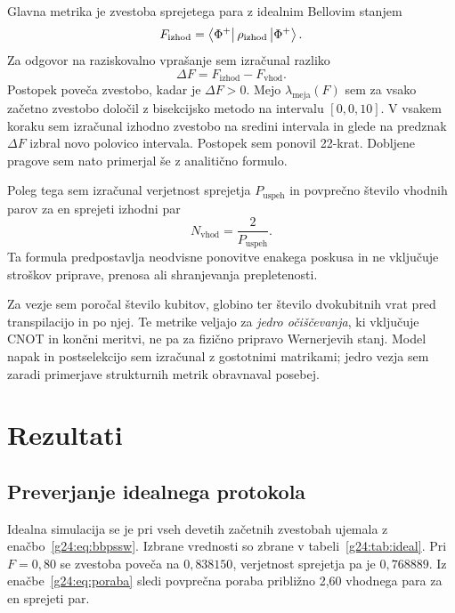 Glavna metrika je zvestoba sprejetega para z idealnim Bellovim stanjem
\begin{equation}
  F_{\mathrm{izhod}}=\bra{\Phi^+}\rho_{\mathrm{izhod}}\ket{\Phi^+}.
  \label{g24:eq:zvestoba}
\end{equation}
Za odgovor na raziskovalno vprašanje sem izračunal razliko
\begin{equation}
 \Delta F=F_{\mathrm{izhod}}-F_{\mathrm{vhod}}.
 \label{g24:eq:razlika}
\end{equation}
Postopek poveča zvestobo, kadar je $\Delta F>0$. Mejo $\lambda_\mathrm{meja}(F)$ sem za vsako začetno zvestobo določil z bisekcijsko metodo na intervalu $[0,0{,}10]$. V vsakem koraku sem izračunal izhodno zvestobo na sredini intervala in glede na predznak $\Delta F$ izbral novo polovico intervala. Postopek sem ponovil 22-krat. Dobljene pragove sem nato primerjal še z analitično formulo.

Poleg tega sem izračunal verjetnost sprejetja $P_{\mathrm{uspeh}}$ in povprečno število vhodnih parov za en sprejeti izhodni par
\begin{equation}
  N_\mathrm{vhod}=\frac{2}{P_{\mathrm{uspeh}}}.
  \label{g24:eq:poraba}
\end{equation}
Ta formula predpostavlja neodvisne ponovitve enakega poskusa in ne vključuje stroškov priprave, prenosa ali shranjevanja prepletenosti.

Za vezje sem poročal število kubitov, globino ter število dvokubitnih vrat pred transpilacijo in po njej. Te metrike veljajo za \emph{jedro očiščevanja}, ki vključuje CNOT in končni meritvi, ne pa za fizično pripravo Wernerjevih stanj. Model napak in postselekcijo sem izračunal z gostotnimi matrikami; jedro vezja sem zaradi primerjave strukturnih metrik obravnaval posebej.

\section{Rezultati}
\label{g24:sec:rezultati}

\subsection{Preverjanje idealnega protokola}

Idealna simulacija se je pri vseh devetih začetnih zvestobah ujemala z enačbo~\eqref{g24:eq:bbpssw}. Izbrane vrednosti so zbrane v tabeli~\ref{g24:tab:ideal}. Pri $F=0{,}80$ se zvestoba poveča na $0{,}838150$, verjetnost sprejetja pa je $0{,}768889$. Iz enačbe~\eqref{g24:eq:poraba} sledi povprečna poraba približno 2,60 vhodnega para za en sprejeti par.

